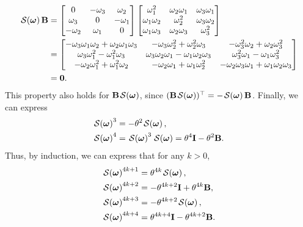 \begin{align}
    \SL[\boldsymbol{\omega}]\mathbf{B} &= \begin{bmatrix}
        0 & -\omega_3 & \omega_2\\
        \omega_3 & 0 & -\omega_1 \\
        -\omega_2 & \omega_1 & 0
    \end{bmatrix}\begin{bmatrix}
        \omega_1^2 & \omega_2\omega_1 & \omega_3\omega_1\\
        \omega_1\omega_2 & \omega_2^2 & \omega_3\omega_2 \\
        \omega_1\omega_3 & \omega_2\omega_3 & \omega_3^2
    \end{bmatrix}\\
    &= \begin{bmatrix}
        -\omega_3\omega_1\omega_2 + \omega_2\omega_1\omega_3 & -\omega_3\omega_2^2+\omega_2^2\omega_3 & -\omega_3^2\omega_2 + \omega_2\omega_3^2\\
        \omega_3\omega_1^2-\omega_1^2\omega_3 & \omega_3\omega_2\omega_1 - \omega_1\omega_2\omega_3 & \omega_3^2\omega_1 - \omega_1\omega_3^2\\
        -\omega_2\omega_1^2 + \omega_1^2\omega_2 & -\omega_2\omega_1 + \omega_1\omega_2^2 & -\omega_2\omega_3\omega_1 + \omega_1\omega_2\omega_3
    \end{bmatrix}\\
    &=\mathbf{0}.
\end{align}
This property also holds for $\mathbf{B}\SL[\boldsymbol{\omega}]$, since $(\mathbf{B}\SL[\boldsymbol{\omega}])^\top=-\SL[\boldsymbol{\omega}]\mathbf{B}$. Finally, we can express
\begin{align}
    \SL[\boldsymbol{\omega}]^3 &= -\theta^2\SL[\boldsymbol{\omega}],\\
    \SL[\boldsymbol{\omega}]^4 &= \SL[\boldsymbol{\omega}]^3\SL[\boldsymbol{\omega}] = \theta^4\mathbf{I} - \theta^2\mathbf{B}.
\end{align}
Thus, by induction, we can express that for any $k>0$,
\begin{align}
    \SL[\boldsymbol{\omega}]^{4k+1} &= \theta^{4k}\SL[\boldsymbol{\omega}],\\
    \SL[\boldsymbol{\omega}]^{4k+2} &= -\theta^{4k+2}\mathbf{I} + \theta^{4k}\mathbf{B},\\
    \SL[\boldsymbol{\omega}]^{4k+3} &= -\theta^{4k+2}\SL[\boldsymbol{\omega}],\\
    \SL[\boldsymbol{\omega}]^{4k+4} &= \theta^{4k+4}\mathbf{I} - \theta^{4k+2}\mathbf{B}.
\end{align}

